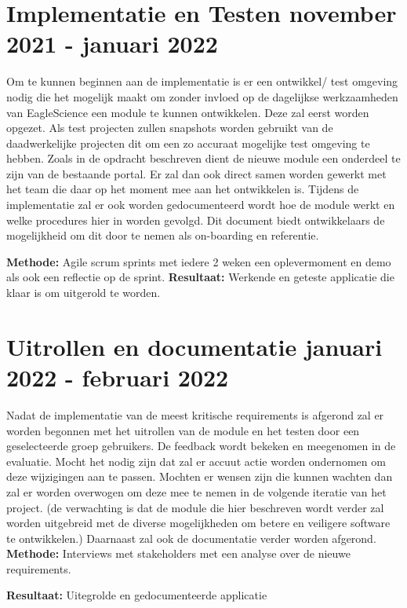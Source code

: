 \section{Implementatie en Testen \textbf{november 2021 - januari 2022 }}\label{sec:implementatie-en-testen}
Om te kunnen beginnen aan de implementatie is er een ontwikkel/ test omgeving nodig die het mogelijk maakt om zonder invloed op de dagelijkse werkzaamheden van EagleScience een module te kunnen ontwikkelen. Deze zal eerst worden opgezet. Als test projecten zullen snapshots worden gebruikt van de daadwerkelijke projecten dit om een zo accuraat mogelijke test omgeving te hebben. Zoals in de opdracht beschreven dient de nieuwe module een onderdeel te zijn van de bestaande portal. Er zal dan ook direct samen worden gewerkt met het team die daar op het moment mee aan het ontwikkelen is. Tijdens de implementatie zal er ook worden gedocumenteerd wordt hoe de module werkt en welke procedures hier in worden gevolgd. Dit document biedt ontwikkelaars de mogelijkheid om dit door te nemen als on-boarding en referentie.

\textbf{Methode:} Agile scrum sprints met iedere 2 weken een oplevermoment en demo als ook een reflectie op de sprint.
\textbf{Resultaat:} Werkende en geteste applicatie die klaar is om uitgerold te worden.

\section{Uitrollen en documentatie \textbf{januari 2022 - februari 2022 }}\label{sec:uitrollen-en-documentatie}
Nadat de implementatie van de meest kritische requirements is afgerond zal er worden begonnen met het uitrollen van de module en het testen door een geselecteerde groep gebruikers. De feedback wordt bekeken en meegenomen in de evaluatie. Mocht het nodig zijn dat zal er accuut actie worden ondernomen om deze wijzigingen aan te passen. Mochten er wensen zijn die kunnen wachten dan zal er worden overwogen om deze mee te nemen in de volgende iteratie van het project. (de verwachting is dat de module die hier beschreven wordt verder zal worden uitgebreid met de diverse mogelijkheden om betere en veiligere software te ontwikkelen.) Daarnaast zal ook de documentatie verder worden afgerond.
\textbf{Methode:} Interviews met stakeholders met een analyse over de nieuwe requirements.

\textbf{Resultaat:} Uitegrolde en gedocumenteerde applicatie
